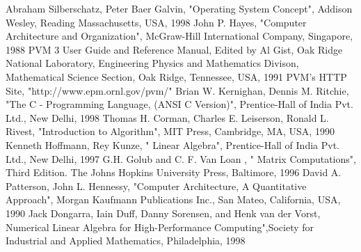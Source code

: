\begin{thebibliography}{99}
\bibitem{}Abraham Silberschatz, Peter Baer Galvin, "Operating System Concept", Addison Wesley, Reading Massachusetts, USA, 1998 
\bibitem{}John P. Hayes, "Computer Architecture and Organization", McGraw-Hill International Company, Singapore, 1988 
\bibitem{}PVM 3 User Guide and Reference Manual, Edited by Al Gist, Oak Ridge National Laboratory, Engineering Physics and Mathematics Divison,
Mathematical Science Section, Oak Ridge, Tennessee, USA, 1991
\bibitem{}PVM's HTTP Site, "http://www.epm.ornl.gov/pvm/"
\bibitem{}Brian W. Kernighan, Dennis M. Ritchie, "The C - Programming Language, (ANSI C Version)", Prentice-Hall of India Pvt. Ltd., New Delhi, 1998
\bibitem{}Thomas H. Corman, Charles E. Leiserson, Ronald L. Rivest, "Introduction to Algorithm", MIT Press, Cambridge, MA, USA, 1990
\bibitem{}Kenneth Hoffmann, Rey Kunze, " Linear Algebra", Prentice-Hall of India Pvt. Ltd., New Delhi, 1997
\bibitem{}G.H. Golub and C. F. Van Loan , " Matrix Computations", Third Edition. The Johns Hopkins University Press, Baltimore, 1996
\bibitem{}David A. Patterson, John L. Hennessy, "Computer Architecture, A Quantitative Approach", Morgan Kaufmann Publications Inc., San Mateo, California,
USA, 1990
\bibitem{}Jack Dongarra, Iain Duff, Danny Sorensen, and Henk van der Vorst, Numerical Linear Algebra for High-Performance Computing",Society for Industrial and
Applied Mathematics, Philadelphia, 1998
\end{thebibliography}
